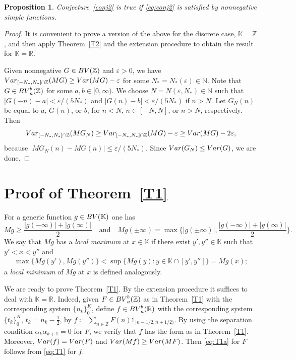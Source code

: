 \documentclass[leqno,11pt]{amsart}
\numberwithin{equation}{section}
\numberwithin{theorem}{section}
\newtheorem{proposition}[theorem]{Proposition}
\newcommand{\KK}{\mathbb{K}}
\newcommand{\RR}{\mathbb{R}}
\newcommand{\ZZ}{\mathbb{Z}}
\newcommand{\NN}{\mathbb{N}}
\newcommand{\Var}{{\rm Var}}
\newcommand{\BV}{{\rm BV}}
\newcommand{\ind}[1]{{\mathds{1}_{{#1}}}}
\begin{document}
	\begin{proposition} \label{T3}
		Conjecture~\ref{conj2} is true if \eqref{eq:conj2} is satisfied by nonnegative simple functions.
	\end{proposition}
	
	\begin{proof}
		It is convenient to prove a version of the above for the discrete case,  $\KK = \ZZ$, and then apply Theorem~\ref{T2} and the extension procedure to obtain the result for  $\KK = \RR$.  
		
		Given nonnegative $G \in \BV(\ZZ)$ and $\varepsilon > 0$, we have $\Var_{[-N_*,N_*] \cap \ZZ} (M G) \geq \Var (MG) - \varepsilon$ for some $N_* = N_*(\varepsilon) \in \NN$.
		Note that $G \in \BV_a^b(\ZZ)$ for some $a,b\in [ 0,\infty)$. We choose $N = N(\varepsilon, N_*) \in \NN$ such that $|G(-n) - a| < \varepsilon / (5N_*)$ and $|G(n) - b| < \varepsilon / (5N_*)$ 
		if $n > N$.
		Let $G_N(n)$ be equal to $a$, $G(n)$, or $b$, for $n < N$, $n \in [-N,N]$, or $n > N$, respectively. Then
		\[
		\Var_{[-N_*,N_*] \cap \ZZ} (M G_N) \geq \Var_{[-N_*,N_*] \cap \ZZ} (M G) - \varepsilon \geq \Var (MG) - 2\varepsilon,
		\]
		because $|MG_N(n) - MG(n)| \leq \varepsilon / (5N_*)$. Since $\Var (G_N) \leq \Var (G)$, we are done.
	\end{proof}
 
	\section{Proof of Theorem~\ref{T1}} \label{S3}
	
	For a generic function $g \in \BV(\KK)$ one has 
	\[
	Mg \geq \frac{|g(-\infty)|+|g(\infty)|}{2}
	\quad \text{and} \quad 
	Mg(\pm \infty) =  \max \Big \{|g(\pm \infty)|, \frac{|g(-\infty)|+|g(\infty)|}{2} \Big \}.
	\]
	We say that $Mg$ has a \textit{local maximum} at $x\in \KK$ if there exist $y',y''\in\KK$ such that $y' < x < y''$ and 
	\begin{align} \label{max-def}
	\max\{Mg(y'), Mg(y'')\} < \sup\{ Mg(y) : y \in  \KK \cap [y',y'']  \}  = Mg(x);
	\end{align}
	a \textit{local minimum} of $Mg$ at $x$ is defined analogously. 
	
	We are ready to prove Theorem~\ref{T1}. By the extension procedure it suffices to deal with 
	$\KK = \RR$. 
	Indeed, given $F \in \BV_a^b(\ZZ)$ as in Theorem~\ref{T1} with the corresponding system $\{n_k\}_0^K$, define $f \in \BV_a^b(\RR)$  with the
	corresponding system $\{t_k\}_0^K$, $t_k=n_k - \frac{1}{2}$, by $f \coloneqq \sum_{n \in \ZZ} F(n) \ind{[n-1/2,n+1/2)}$. By using the separation condition $\alpha_k \alpha_{k+1} = 0$ for $F$, we verify that $f$ has the form as in Theorem~\ref{T1}. Moreover, $\Var (f) = \Var(F)$ and 
	$\Var (Mf) \geq \Var(MF)$. Then \eqref{eq:T1a} for $F$ follows from \eqref{eq:T1} for $f$.
	
\end{document}
